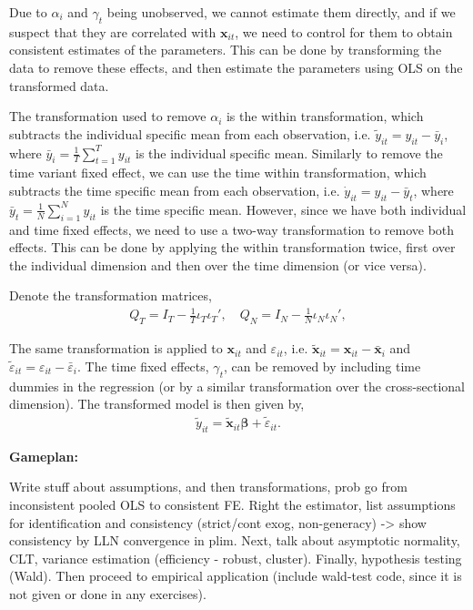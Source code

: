 Due to $\alpha_i$ and $\gamma_t$ being unobserved, we cannot estimate them directly, and if we suspect that they are correlated with $\bm{x}_{it}$, we need to control for them to obtain consistent estimates of the parameters. This can be done by transforming the data to remove these effects, and then estimate the parameters using OLS on the transformed data.

The transformation used to remove $\alpha_i$ is the within transformation, which subtracts the individual specific mean from each observation, i.e. $\tilde{y}_{it} = y_{it} - \bar{y}_i$, where $\bar{y}_i = \frac{1}{T} \sum_{t=1}^T y_{it}$ is the individual specific mean. Similarly to remove the time variant fixed effect, we can use the time within transformation, which subtracts the time specific mean from each observation, i.e. $\dot{y}_{it} = y_{it} - \bar{y}_t$, where $\bar{y}_t = \frac{1}{N} \sum_{i=1}^N y_{it}$ is the time specific mean. However, since we have both individual and time fixed effects, we need to use a two-way transformation to remove both effects. This can be done by applying the within transformation twice, first over the individual dimension and then over the time dimension (or vice versa). 

Denote the transformation matrices, 
\begin{align*}
    Q_T = I_T - \frac{1}{T} \iota_T \iota_T', \quad Q_N = I_N - \frac{1}{N} \iota_N \iota_N',
\end{align*}

The same transformation is applied to $\bm{x}_{it}$ and $\varepsilon_{it}$, i.e. $\tilde{\bm{x}}_{it} = \bm{x}_{it} - \bar{\bm{x}}_i$ and $\tilde{\varepsilon}_{it} = \varepsilon_{it} - \bar{\varepsilon}_i$. The time fixed effects, $\gamma_t$, can be removed by including time dummies in the regression (or by a similar transformation over the cross-sectional dimension). The transformed model is then given by, 
\begin{align*}
    \tilde{y}_{it} = \tilde{\bm{x}}_{it} \bm{\beta} + \tilde{\varepsilon}_{it}.
\end{align*}


\textbf{Gameplan:}

Write stuff about assumptions, and then transformations, prob go from inconsistent pooled OLS to consistent FE. Right the estimator, list assumptions for identification and consistency (strict/cont exog, non-generacy) -> show consistency by LLN convergence in plim. Next, talk about asymptotic normality, CLT, variance estimation (efficiency - robust, cluster). Finally, hypothesis testing (Wald). Then proceed to empirical application (include wald-test code, since it is not given or done in any exercises).

